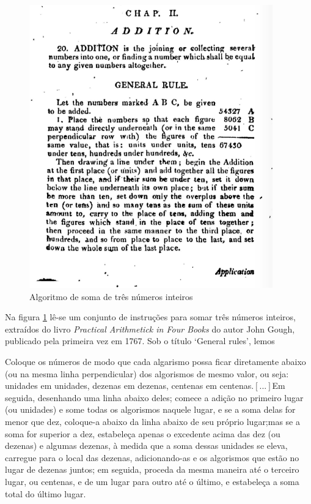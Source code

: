 \begin{figure}[htb]
	\caption{Algoritmo de soma de três números inteiros}
	\begin{center}
	    \includegraphics[scale=1]{imagens/algorithm.png}
	\end{center}
	\label{fig:algoritmo}
\end{figure}

Na figura \ref{fig:algoritmo} lê-se um conjunto de instruções para somar três números inteiros, extraídos do livro \textit{Practical Arithmetick in Four Books} do autor John Gough, publicado pela primeira vez em 1767. Sob o título `General rules', lemos

\begin{citacao}
	Coloque os números de modo que cada algarismo possa ficar diretamente abaixo (ou na mesma linha perpendicular) dos algorismos de mesmo valor, ou seja: unidades em unidades, dezenas em dezenas, centenas em centenas.$[...]$Em seguida, desenhando uma linha abaixo deles; comece a adição no primeiro lugar (ou unidades) e some todas os algorismos naquele lugar, e se a soma delas for menor que dez, coloque-a abaixo da linha abaixo de seu próprio lugar;mas se a soma for superior a dez, estabeleça apenas o excedente acima das dez (ou dezenas) e algumas dezenas, à medida que a soma dessas unidades se eleva, carregue para o local das dezenas, adicionando-as e os algorismos que estão no lugar de dezenas juntos; em seguida, proceda da mesma maneira até o terceiro lugar, ou centenas, e de um lugar para outro até o último, e estabeleça a soma total do último lugar.  
\end{citacao}


